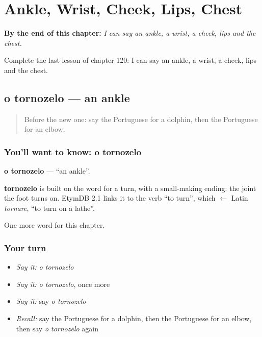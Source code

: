 
\chapter{Ankle, Wrist, Cheek, Lips, Chest}
\label{ch:pt-ankle-wrist-cheek-lips-chest}

\begin{chapteropening}
\textbf{By the end of this chapter:} \emph{I can say an ankle, a wrist, a cheek, lips and the chest.}

Complete the last lesson of chapter 120: I can say an ankle, a wrist, a cheek, lips and the chest.
\end{chapteropening}

\section[o tornozelo]{o tornozelo — an ankle}

\label{lesson:PT-C120-tornozelo}



\begin{quote}
Before the new one: say the Portuguese for a dolphin, then the Portuguese for an elbow.
\end{quote}

\subsection*{You'll want to know: o tornozelo}
\textbf{o tornozelo} — \textquotedblleft{}an ankle\textquotedblright{}.

\begin{cousinweb}
\textbf{tornozelo} is built on the word for a turn, with a small-making ending: the joint the foot turns on. EtymDB 2.1 links it to the verb \textquotedblleft{}to turn\textquotedblright{}, which $\leftarrow$ Latin \emph{tornare}, \textquotedblleft{}to turn on a lathe\textquotedblright{}.
\end{cousinweb}

\begin{grammarlens}[title={What you've built}]
One more word for this chapter.
\end{grammarlens}

\subsection*{Your turn}
\begin{itemize}
\raggedright
  \item \emph{Say it:} \emph{o tornozelo}
  \item \emph{Say it:} \emph{o tornozelo}, once more
  \item \emph{Say it:} say \emph{o tornozelo}
  \item \emph{Recall:} say the Portuguese for a dolphin, then the Portuguese for an elbow, then say \emph{o tornozelo} again
\end{itemize}

